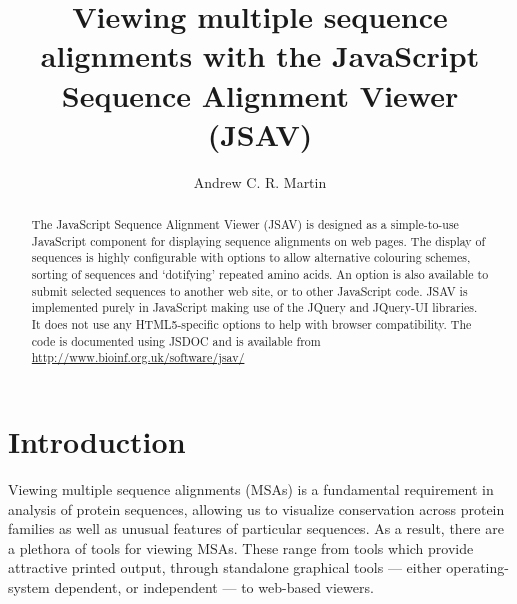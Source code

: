 \documentclass[10pt,a4paper,twocolumn]{article}
\begin{document}
\title{Viewing multiple sequence alignments with
  the {J}avaScript {S}equence {A}lignment {V}iewer (JSAV)}

\author[1]{Andrew C. R. Martin}

\maketitle

\begin{abstract}

The JavaScript Sequence Alignment Viewer (JSAV) is designed as a simple-to-use JavaScript component for displaying sequence alignments on web pages.  The display of sequences
is highly configurable with options to allow alternative colouring
schemes, sorting of sequences and `dotifying' repeated amino acids. An
option is also available to submit selected sequences to another web
site, or to other JavaScript code. 
JSAV is implemented purely in JavaScript making use of the JQuery and
JQuery-UI libraries. It does not use any HTML5-specific options to help with
browser compatibility. The code is documented using JSDOC
and is available from \url{http://www.bioinf.org.uk/software/jsav/}

\end{abstract}
\clearpage

\section*{Introduction}
Viewing multiple sequence alignments (MSAs) is a fundamental
requirement in analysis of protein sequences, allowing us to visualize
conservation across protein families as well as unusual features of
particular sequences. As a result, there are a plethora of tools for
viewing MSAs. These range from tools which provide attractive printed
output, through standalone graphical tools --- either operating-system
dependent, or independent --- to web-based viewers.
\end{document}

